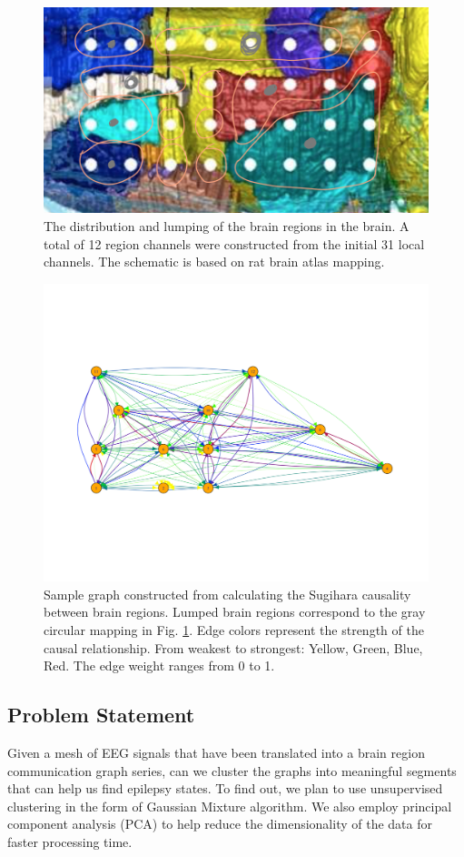 \documentclass[journal,12pt,onecolumn,draftclsnofoot]{IEEEtran}  %
\begin{document}
\begin{figure}[H]
  \centering
  \includegraphics[width=0.65\linewidth]{figures/brain_region_lump.png}
  \caption{The distribution and lumping of the brain regions in the brain. A total of 12 region channels were constructed from the initial 31 local channels. The schematic is based on rat brain atlas mapping.}
  \label{fig:brain_region_lumping}
\end{figure}


\begin{figure}[H]
  \centering
  \includegraphics[width=0.55\linewidth]{figures/sample_graph.pdf}
  \caption{Sample graph constructed from calculating the Sugihara causality between brain regions. Lumped brain regions correspond to the gray circular mapping in Fig. \ref{fig:brain_region_lumping}. Edge colors represent the strength of the causal relationship. From weakest to strongest: Yellow, Green, Blue, Red. The edge weight ranges from 0 to 1.}
  \label{fig:sample_graph}
\end{figure}


\subsection{Problem Statement}

Given a mesh of EEG signals that have been translated into a brain region communication graph series, can we cluster the graphs into meaningful segments that can help us find epilepsy states. To find out, we plan to use unsupervised clustering in the form of Gaussian Mixture algorithm. We also employ principal component analysis (PCA) to help reduce the dimensionality of the data for faster processing time.
\end{document}
